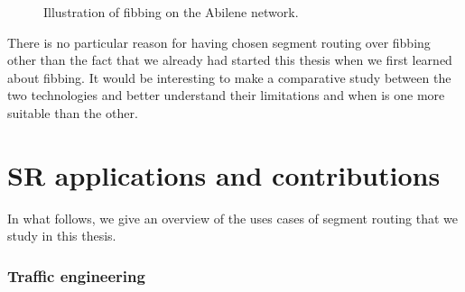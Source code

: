\begin{figure}[H]
\begin{center}
\end{center}
\caption{Illustration of fibbing on the Abilene network.}
\label{fig:intro_fibbing}
\end{figure}

There is no particular reason for having chosen segment routing over fibbing other than the fact that we already had started 
this thesis when we first learned about fibbing. It would be interesting to make a comparative
study between the two technologies and better understand their limitations and when is one more suitable than the other.

\section{SR applications and contributions}

In what follows, we give an overview of the uses cases of segment routing that we study in this thesis.

\subsubsection*{Traffic engineering}


